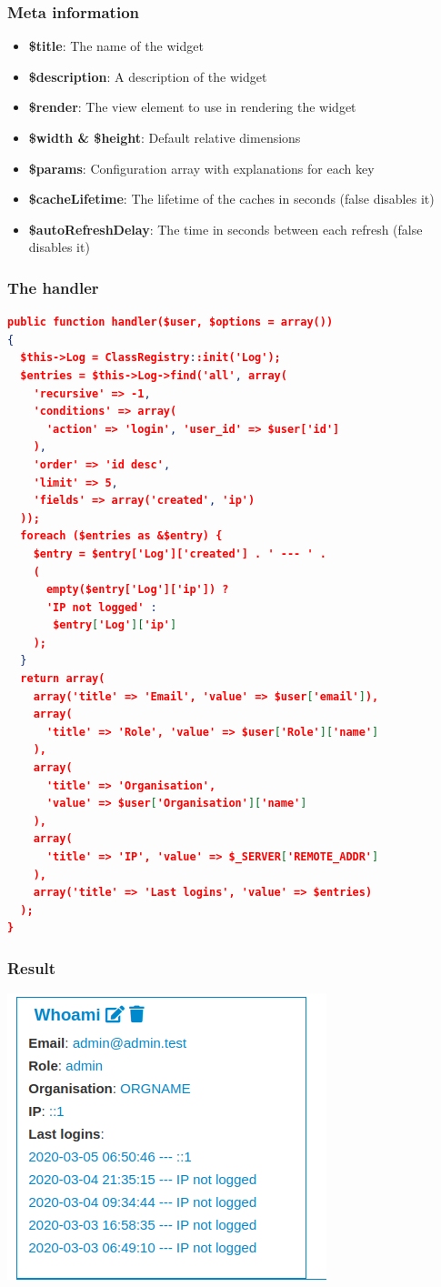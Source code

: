 \begin{frame}
  \frametitle{Meta information}
  \begin{itemize}
    \item {\bf \$title}: The name of the widget
    \item {\bf \$description}: A description of the widget
    \item {\bf \$render}: The view element to use in rendering the widget
    \item {\bf \$width \& \$height}: Default relative dimensions
    \item {\bf \$params}: Configuration array with explanations for each key
    \item {\bf \$cacheLifetime}: The lifetime of the caches in seconds (false disables it)
    \item {\bf \$autoRefreshDelay}: The time in seconds between each refresh (false disables it)
  \end{itemize}
  
\end{frame}

\begin{frame}[fragile]
  \frametitle{The handler}
    \begin{adjustbox}{height=4cm,keepaspectratio}
        \begin{lstlisting}[language=json,firstnumber=1]
public function handler($user, $options = array())
{
  $this->Log = ClassRegistry::init('Log');
  $entries = $this->Log->find('all', array(
    'recursive' => -1,
    'conditions' => array(
      'action' => 'login', 'user_id' => $user['id']
    ),
    'order' => 'id desc',
    'limit' => 5,
    'fields' => array('created', 'ip')
  ));
  foreach ($entries as &$entry) {
    $entry = $entry['Log']['created'] . ' --- ' .
    (
      empty($entry['Log']['ip']) ?
      'IP not logged' :
       $entry['Log']['ip']
    );
  }
  return array(
    array('title' => 'Email', 'value' => $user['email']),
    array(
      'title' => 'Role', 'value' => $user['Role']['name']
    ),
    array(
      'title' => 'Organisation',
      'value' => $user['Organisation']['name']
    ),
    array(
      'title' => 'IP', 'value' => $_SERVER['REMOTE_ADDR']
    ),
    array('title' => 'Last logins', 'value' => $entries)
  );
}
        \end{lstlisting}
    \end{adjustbox}
\end{frame}

\begin{frame}
  \frametitle{Result}
  \begin{center}
    \includegraphics[scale=0.5]{whoami.png}
  \end{center}
\end{frame}

